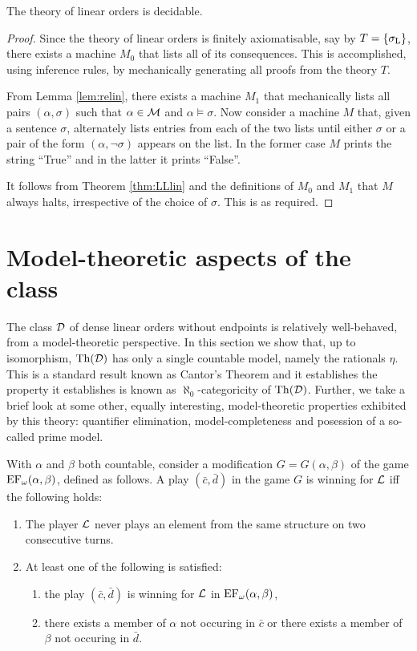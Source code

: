 \begin{thm}
	The theory of linear orders is decidable.
\end{thm}
\begin{proof}
	Since the theory of linear orders is finitely axiomatisable, say by $T=\left\lbrace \sigma_{\mathrm{L}}\right\rbrace$, there exists a machine $M_0$ that lists all of its consequences.  This is accomplished, using inference rules, by mechanically generating all proofs from the theory $T$.

	From Lemma \ref{lem:relin}, there exists a machine $M_1$ that mechanically lists all pairs $(\alpha,\sigma)$ such that $\alpha\in\mathcal{M}$ and $\alpha\models\sigma$.  Now consider a machine $M$ that, given a sentence $\sigma$, alternately lists entries from each of the two lists until either $\sigma$ or a pair of the form $(\alpha,\neg\sigma)$ appears on the list.  In the former case $M$ prints the string ``True'' and in the latter it prints ``False''.

	It follows from Theorem \ref{thm:LLlin} and the definitions of $M_0$ and $M_1$ that $M$ always halts, irrespective of the choice of $\sigma$.  This is as required.
\end{proof}


\section{Model-theoretic aspects of the class \text{$\dense$}}

The class $\dense$ of dense linear orders without endpoints is relatively
well-behaved, from a model-theoretic perspective.  In this section we show that,
up to isomorphism, $\operatorname{Th}(\mathcal{D})$ has only a single countable model, namely the
rationals $\eta$.  This is a standard result known as Cantor's Theorem and it
establishes the property it establishes is known as $\aleph_0$-categoricity of
$\operatorname{Th}(\mathcal{D})$.  Further, we take a brief look at some other, equally
interesting, model-theoretic properties exhibited by this theory: quantifier
elimination, model-completeness and posession of a so-called prime model.

With $\alpha$ and $\beta$ both countable, consider a modification
$G=G(\alpha,\beta)$ of the game $\operatorname{EF}_{\omega}(\alpha,\beta)$, defined as
follows.  A play $(\bar{c},\bar{d})$ in the game $G$ is winning for $\mathcal{L}$ iff
the following holds:
\begin{enumerate}[noitemsep]
	\item The player $\mathcal{L}$ never plays an element from the same structure on
	      two consecutive turns.
	\item At least one of the following is satisfied:
	      \begin{enumerate}
		      \item the play $(\bar{c},\bar{d})$ is winning for $\mathcal{L}$ in
		            $\operatorname{EF}_\omega(\alpha,\beta)$,
		      \item there exists a member of $\alpha$ not occuring in $\bar{c}$ or
		            there exists a member of $\beta$ not occuring in $\bar{d}$.
	      \end{enumerate}
\end{enumerate}

